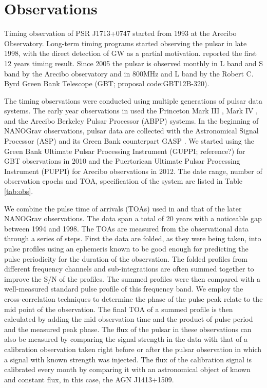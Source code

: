 \section{Observations}
Timing observation of PSR J1713+0747 started from 1993 at the Arecibo
Observatory. Long-term timing programs started observing the pulsar in late 1998, with the direct detection of GW as a partial motivation. \citet{sns+05} reported the first 12 years timing result. Since 2005 the pulsar is observed monthly
in L band and S band by the Arecibo
observatory and in 800MHz and L band by the Robert C. Byrd Green Bank
Telescope (GBT; proposal code:GBT12B-320).

The timing observations were conducted 
using multiple generations of pulsar data systems. The early year
observations in \citet{sns+05} used
 the Princeton Mark III \citep{skn+92}, Mark IV
\citep{sst+00}, and the Arecibo Berkeley Pulsar Processor (ABPP) systems. 
In the beginning of NANOGrav observations, pulsar data are collected with the Astronomical Signal
Processor (ASP) and its Green Bank counterpart GASP \citep{dem07}. We
started using 
the Green Bank Ultimate Pulsar Processing Instrument (GUPPI; reference?) for GBT 
observations in 2010 and the Puertorican Ultimate Pulsar Processing Instrument
(PUPPI) for Arecibo observations in 2012. 
The date range, number of observation epochs and TOA, specification of the
system are listed in Table \ref{tab:obs}.

We combine the pulse time of arrivals (TOAs) used in \citealt{sns+05} and that
of the later NANOGrav observations. 
The data span a total of 20 years with a noticeable gap between 1994 and 1998.
The TOAs are measured from the observational data through a series of steps. First the data are folded, as they were being taken, into pulse profiles using an ephemeris known to be good enough for predicting the pulse periodicity for the duration of the observation. The folded profiles from different frequency channels and sub-integrations are often summed together to improve the S/N of the profiles.
The summed profiles were then compared with a well-measured standard pulse profile  of this frequency band. We employ the cross-correlation techniques to determine the phase of the pulse peak relate to the mid point of the observation. The final TOA of a summed profile is then calculated by adding the mid observation time and the product of pulse period and the measured peak phase.
The flux of the pulsar in these observations can also be measured by comparing the signal strength in the data with that of a calibration observation taken right before or after the pulsar observation in which a signal with known strength was injected. The flux of the calibration signal is calibrated every month by comparing it with an astronomical object of known and constant flux, in this case, the AGN J1413+1509.




